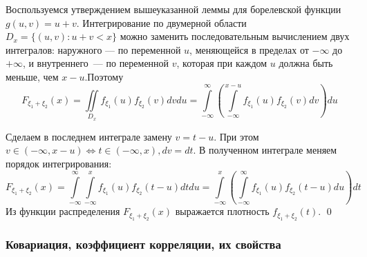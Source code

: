 \documentclass[oneside,final,14pt]{extreport}
\renewenvironment{proof}{{\bfseries Доказательство.}}{\qed}
\theoremstyle{plain}
\theoremstyle{definition}
\theoremstyle{named}
\begin{document}
\begin{proof}
    Воспользуемся утверждением вышеуказанной леммы для борелевской функции $g(u, v)=u+v$. Интегрирование по двумерной области $D_{x}=\{(u, v) \colon u+v<x\}$ можно заменить последовательным вычислением двух интегралов: наружного — по переменной $u$, меняющейся в пределах от $-\infty$ до $+\infty$, и внутреннего~--- по переменной $v$, которая при каждом $u$ должна быть меньше, чем $x-u$.Поэтому
    \begin{equation*}
        F_{\xi_{1}+\xi_{2}}(x)=\iint\limits_{D_{x}} f_{\xi_{1}}(u) f_{\xi_{2}}(v) d v d u=\int\limits_{-\infty}^{\infty}\left(\int\limits_{-\infty}^{x-u} f_{\xi_{1}}(u) f_{\xi_{2}}(v) d v\right) d u
    \end{equation*}
    
    Сделаем в последнем интеграле замену $v=t-u$. При этом $v \in(-\infty, x-u) \Leftrightarrow t \in(-\infty, x), d v=d t$. В полученном интеграле меняем порядок интегрирования:
    \begin{equation*}
        F_{\xi_{1}+\xi_{2}}(x)=\int\limits_{-\infty}^{\infty} \int\limits_{-\infty}^{x} f_{\xi_{1}}(u) f_{\xi_{2}}(t-u) d t d u=\int\limits_{-\infty}^{x}\left(\int\limits_{-\infty}^{\infty} f_{\xi_{1}}(u) f_{\xi_{2}}(t-u) d u\right) d t
    \end{equation*}
    Из функции распределения $F_{\xi_{1}+\xi_{2}}(x)$ выражается плотность $f_{\xi_{1}+\xi_{2}}(t)$.
\end{proof}

\subsubsection{Ковариация, коэффициент корреляции, их свойства}
\end{document}

